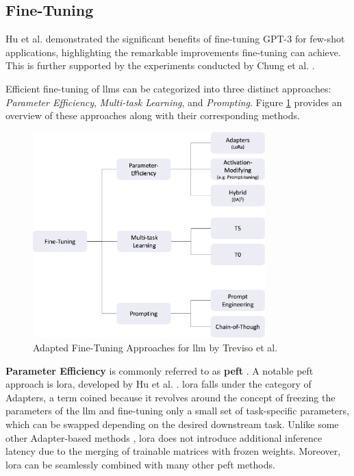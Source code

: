 \subsection{Fine-Tuning}
\label{subsec:llm_fine_tuning}

Hu et al. \cite{hu_lora_nodate} demonstrated the significant benefits of fine-tuning GPT-3 for few-shot applications, highlighting the remarkable improvements fine-tuning can achieve. This is further supported by the experiments conducted by Chung et al. \cite{chung_scaling_2022}.

Efficient fine-tuning of \gls{llm}s can be categorized into three distinct approaches: \textit{Parameter Efficiency}, \textit{Multi-task Learning}, and \textit{Prompting}. Figure \ref{fig:llm_fine_tuning} provides an overview of these approaches along with their corresponding methods.

\begin{figure}
    \centering
    \includegraphics[width=0.8\textwidth]{Grafiken/fine_tuning_approaches.png}
    \caption{Adapted Fine-Tuning Approaches for \gls{llm} by Treviso et al. \cite{treviso_efficient_2023}}
    \label{fig:llm_fine_tuning}
\end{figure}

\textbf{Parameter Efficiency} is commonly referred to as \textbf{\gls{peft}} \cite{noauthor_peft_nodate}. A notable \gls{peft} approach is \gls{lora}, developed by Hu et al. \cite{hu_lora_nodate}. \gls{lora} falls under the category of Adapters, a term coined because it revolves around the concept of freezing the parameters of the \gls{llm} and fine-tuning only a small set of task-specific parameters, which can be swapped depending on the desired downstream task. Unlike some other Adapter-based methods \cite{houlsby_parameter-efficient_2019}, \gls{lora} does not introduce additional inference latency due to the merging of trainable matrices with frozen weights. Moreover, \gls{lora} can be seamlessly combined with many other \gls{peft} methods.

